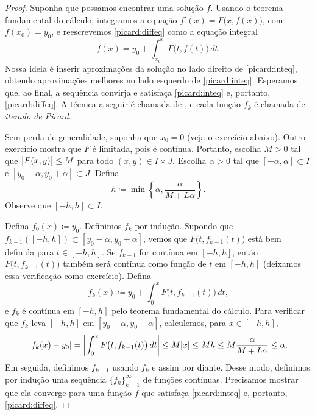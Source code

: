 \begin{proof}
\pagebreak[2]
Suponha que possamos encontrar uma solução $f$. Usando o teorema
fundamental do cálculo, integramos a equação
$f'(x) = F\bigl(x,f(x)\bigr)$, com $f(x_0) = y_0$, e reescrevemos
\eqref{picard:diffeq} como a equação integral
\begin{equation} \label{picard:inteq}
f(x) = y_0 + \int_{x_0}^x F\bigl(t,f(t)\bigr)\,dt .
\end{equation}
Nossa ideia é inserir aproximações da solução no lado direito de
\eqref{picard:inteq}, obtendo aproximações melhores no lado esquerdo de
\eqref{picard:inteq}. Esperamos que, ao final, a sequência convirja e
satisfaça \eqref{picard:inteq} e, portanto, \eqref{picard:diffeq}.
A técnica a seguir é chamada de \emph{},
e cada função $f_k$ é chamada de \emph{iterado de Picard}.

Sem perda de generalidade, suponha que $x_0 = 0$ (veja o exercício abaixo).
Outro exercício mostra que $F$ é limitada, pois é contínua. Portanto,
escolha $M > 0$ tal que
$\bigl\lvert {F(x,y)} \bigr\rvert \leq M$ para todo $(x,y) \in I\times J$.
Escolha $\alpha > 0$ tal que
$[-\alpha,\alpha] \subset I$ e $[y_0-\alpha, y_0 + \alpha] \subset J$.
Defina
\begin{equation*}
h \coloneqq \min \left\{ \alpha, \frac{\alpha}{M+L\alpha} \right\} .
\end{equation*}
Observe que
$[-h,h] \subset I$.

Defina $f_0(x) \coloneqq y_0$.
Definimos $f_k$ por indução.
Supondo que $f_{k-1}([-h,h]) \subset [y_0-\alpha,y_0+\alpha]$,
vemos que $F\bigl(t,f_{k-1}(t)\bigr)$ está bem definida para
$t \in [-h,h]$.
Se $f_{k-1}$ for contínua em $[-h,h]$, então
$F\bigl(t,f_{k-1}(t)\bigr)$ também será contínua como função de $t$ em
$[-h,h]$ (deixamos essa verificação como exercício).
Defina
\begin{equation*}
f_k(x) \coloneqq y_0+ \int_{0}^x F\bigl(t,f_{k-1}(t)\bigr)\,dt ,
\end{equation*}
e $f_k$ é contínua em $[-h,h]$ pelo teorema fundamental do cálculo.
Para verificar que $f_k$ leva $[-h,h]$ em $[y_0-\alpha,y_0+\alpha]$,
calculemos, para $x \in [-h,h]$,
\begin{equation*}
\lvert {f_k(x) - y_0} \rvert = 
\left\lvert {\int_{0}^x F\bigl(t,f_{k-1}(t)\bigr)\,dt } \right\rvert
\leq
M\lvert {x} \rvert
\leq
Mh
\leq
M
\frac{\alpha}{M+L\alpha}
\leq \alpha .
\end{equation*}
Em seguida, definimos $f_{k+1}$ usando $f_k$ e assim por diante.
Desse modo, definimos por indução uma sequência $\{ f_k \}_{k=1}^\infty$
de funções contínuas.
Precisamos mostrar que ela converge para uma função $f$ que satisfaça
\eqref{picard:inteq} e, portanto, \eqref{picard:diffeq}.


\end{proof}
